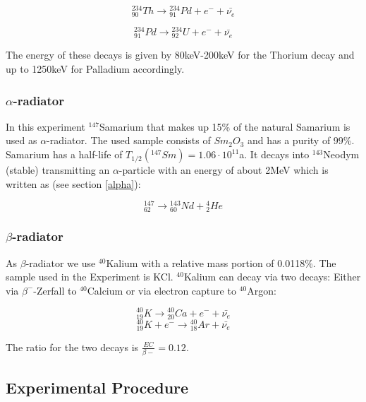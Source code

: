 \documentclass[12pt]{article}
\begin{document}
\[{}^{234}_{90}Th \rightarrow {}^{234}_{91}Pd + e^- + \bar{\nu_e}\]

\[{}^{234}_{91}Pd \rightarrow {}^{234}_{92}U + e^- + \bar{\nu_e}\]

The energy of these decays is given by 80keV-200keV for the Thorium decay and up to 1250keV for Palladium accordingly.


\subsubsection{$\alpha$-radiator}

In this experiment ${}^{147}$Samarium that makes up 15\% of the natural Samarium is used as $\alpha$-radiator. The used sample consists of $Sm_2O_3$ and has a purity of 99\%. Samarium has a half-life of  $T_{1/2}({}^{147}Sm)=1.06\cdot10^{11}$a. It decays into ${}^{143}$Neodym (stable) transmitting an $\alpha$-particle with an energy of about 2MeV which is written as (see section \ref{alpha}):

\[{}^{147}_{62} \rightarrow {}^{143}_{60}Nd + {}^4_2He\]

\subsubsection{$\beta$-radiator}
As $\beta$-radiator we use ${}^{40}$Kalium with a relative  mass portion of 0.0118\%. The sample used in the Experiment is KCl. 
${}^{40}$Kalium can decay via two decays: Either via $\beta^-$-Zerfall to ${}^{40}$Calcium or via electron capture to ${}^{40}$Argon:

\[{}^{40}_{19}K \rightarrow {}^{40}_{20}Ca + e^- + \bar{\nu_e}\]
\[{}^{40}_{19}K + e^- \rightarrow {}^{40}_{18}Ar + \bar{\nu_e}\]

The ratio for the two decays is $\frac{EC}{\beta-}=0.12$.\\

\subsection{Experimental Procedure}
\end{document}
